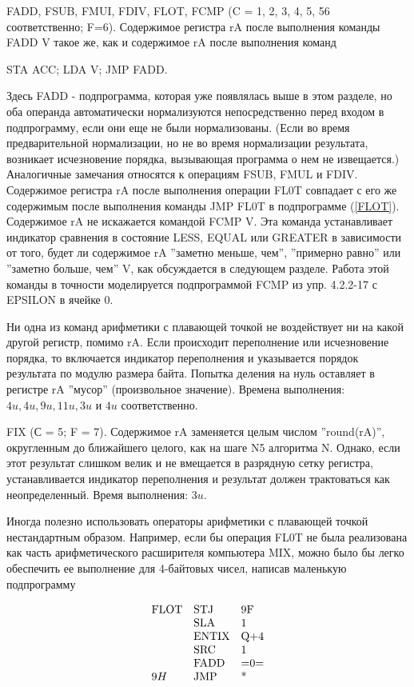 \point{} FADD, FSUB, FMUI, FDIV, FLOT, FCMP (C = 1, 2, 3, 4, 5, 56 соответственно; F=6). Содержимое регистра rA после выполнения команды FADD V такое же, как и содержимое rA после выполнения команд
\begin{center}
STA ACC; LDA V; JMP FADD.
\end{center}

Здесь FADD - подпрограмма, которая уже появлялась выше в этом разделе, но оба операнда автоматически нормализуются непосредственно перед входом в подпрограмму, если они еще не были нормализованы. (Если во время предварительной нормализации, но не во время нормализации результата, возникает исчезновение порядка, вызывающая программа о нем не извещается.) Аналогичные замечания относятся к операциям FSUB, FMUL и FDIV. Содержимое регистра rA после выполнения операции FL0T совпадает с его же содержимым после выполнения команды JMP FL0T в подпрограмме (\ref{FLOT}). Содержимое rA не искажается командой FCMP V. Эта команда устанавливает индикатор сравнения в состояние LESS, EQUAL или GREATER в зависимости от того, будет ли содержимое rA ''заметно меньше, чем'', ''примерно равно'' или ''заметно больше, чем'' V, как обсуждается в следующем разделе. Работа этой команды в точности моделируется подпрограммой FCMP из упр. 4.2.2-17 с EPSILON в ячейке 0.

Ни одна из команд арифметики с плавающей точкой не воздействует ни на какой другой регистр, помимо rA. Если происходит переполнение или исчезновение порядка, то включается индикатор переполнения и указывается порядок результата по модулю размера байта. Попытка деления на нуль оставляет в регистре rA ''мусор'' (произвольное значение). Времена выполнения: $4u, 4u, 9u, 11u, 3u$ и $4u$ соответственно.

\point{} FIX (С = 5; F = 7). Содержимое rA заменяется целым числом ''round(rA)'', округленным до ближайшего целого, как на шаге N5 алгоритма N. Однако, если этот результат слишком велик и не вмещается в разрядную сетку регистра, устанавливается индикатор переполнения и результат должен трактоваться как неопределенный. Время выполнения: $3u$.

Иногда полезно использовать операторы арифметики с плавающей точкой нестандартным образом. Например, если бы операция FL0T не была реализована как часть арифметического расширителя компьютера MIX, можно было бы легко обеспечить ее выполнение для 4-байтовых чисел, написав маленькую подпрограмму

\begin{equation}\label{FLAT}
\begin{array}{l l l} 
\text{FLOT} & \text{STJ} & \text{9F}\\
& \text{SLA} & 1\\
& \text{ENTIX} & \text{Q+4}\\
& \text{SRC} & 1\\
& \text{FADD} & \text{=0=}\\
9H & \text{JMP} & \text{*}\\
\end{array}
\end{equation}


